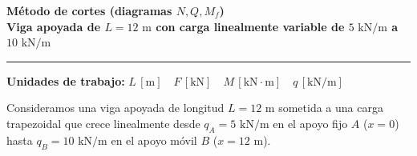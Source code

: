 \begin{tcolorbox}[colback=blue!3!white, colframe=blue!40!black, arc=3pt, boxrule=0.8pt, left=8pt, right=8pt, top=6pt, bottom=6pt]
    \centering
    {\Large\bfseries\color{blue!60!black} Método de cortes (diagramas $N, Q, M_f$)}\\[2pt]
    {\normalsize\bfseries Viga apoyada de $L = 12\text{ m}$ con carga linealmente variable de $5\text{ kN/m}$ a $10\text{ kN/m}$}

    \vspace{4pt}\hrule\vspace{4pt}
    {\small\textbf{Unidades de trabajo:} $L\,[\text{m}] \quad F\,[\text{kN}] \quad M\,[\text{kN}\cdot\text{m}] \quad q\,[\text{kN/m}]$}
\end{tcolorbox}


Consideramos una viga apoyada de longitud $L = 12\text{ m}$ sometida a una carga trapezoidal que crece linealmente desde $q_A = 5\text{ kN/m}$ en el apoyo fijo $A$ ($x = 0$) hasta $q_B = 10\text{ kN/m}$ en el apoyo móvil $B$ ($x = 12\text{ m}$).

